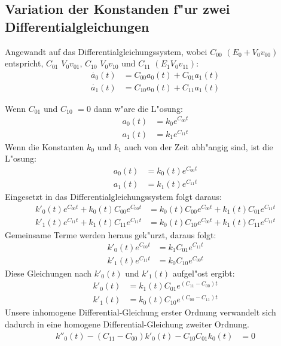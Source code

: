 \begin{refsection}
\subsection{Variation der Konstanden f"ur zwei Differentialgleichungen}
Angewandt auf das Differentialgleichungssystem,
wobei $C_{00}$ $(E_{0} + V_{0} v_{00})$
entspricht,
$C_{01}$ $V_{0} v_{01}$,
$C_{10}$ $V_{0} v_{10}$ und $C_{11}$ $(E_{1} V_{0} v_{11})$:
\begin{align*}
\dot{a_{0}}(t) &= C_{00}a_{0}(t) + C_{01}a_{1}(t)
\\
\dot{a_{1}}(t) &= C_{10}a_{0}(t) + C_{11}a_{1}(t)
\end{align*}

Wenn $ C_{01}$ und $ C_{10}$ $ =0$ dann w"are die L"osung:
\begin{align*}
a_{0}(t)&= k_0 e^{C_{00} t} 
\\
a_{1}(t)&= k_1 e^{C_{11} t}
\end{align*}
Wenn die Konstanten $ k_0 $ und $ k_1 $
auch von der Zeit abh"angig sind, ist die L"osung: 
\begin{align*}
a_{0}(t)&= k_0(t) e^{C_{00} t} 
\\
a_{1}(t)&= k_1(t) e^{C_{11} t} 
\end{align*}
Eingesetzt in das Differentialgleichungssystem folgt daraus:
\begin{align*}
k'_{0}(t) e^{C_{00} t} + k_{0}(t) C_{00} e^{C_{00} t}&= k_{0}(t) C_{00} e^{C_{00} t} + k_{1}(t)C_{01}e^{C_{11} t}
\\
k'_{1}(t) e^{C_{11} t} + k_{1}(t) C_{11} e^{C_{11} t}&= k_{0}(t) C_{10} e^{C_{00} t} + k_{1}(t)C_{11}e^{C_{11} t}
\end{align*}
Gemeinsame Terme werden heraus gek"urzt, daraus folgt:
\begin{align*}
k'_{0}(t) e^{C_{00} t}&= k_{1} C_{01} e^{C_{11} t}
\\
k'_{1}(t) e^{C_{11} t}&= k_{0} C_{10} e^{C_{00} t}
\end{align*}
Diese Gleichungen nach $ k'_{0}(t)$ und $ k'_{1}(t)$ aufgel"ost ergibt:
\begin{align*}
k'_{0}(t)&= k_{1}(t) C_{01} e^{(C_{11}-C_{00}) t}
\\
k'_{1}(t)&= k_{0}(t) C_{10} e^{(C_{00}-C_{11}) t}
\end{align*}
Unsere inhomogene Differential-Gleichung erster Ordnung verwandelt
sich dadurch in eine homogene Differential-Gleichung zweiter Ordnung.
\begin{align*}
k''_{0}(t) - (C_{11}-C_{00}) k'_{0}(t) - C_{10}C_{01}k_0(t)&= 0

\end{align*}
\end{refsection}
